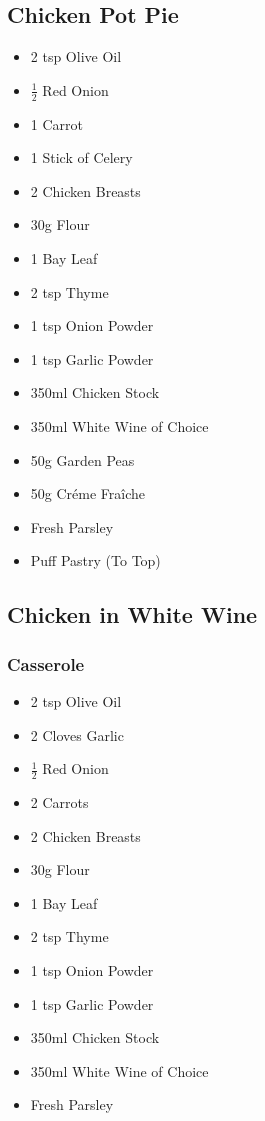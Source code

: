 \documentclass[11pt, english]{article}
\begin{document}
\newpage

	\subsection{Chicken Pot Pie}

	\begin{itemize}
	\setlength\itemsep{0cm}
		\item 2 tsp Olive Oil
		\item $\frac{1}{2}$ Red Onion
		\item 1 Carrot
		\item 1 Stick of Celery
		\item 2 Chicken Breasts
		\item 30g Flour
		\item 1 Bay Leaf
		\item 2 tsp Thyme
		\item 1 tsp Onion Powder
		\item 1 tsp Garlic Powder
		\item 350ml Chicken Stock
		\item 350ml White Wine of Choice
		\item 50g Garden Peas
		\item 50g Cr\'{e}me Fra\^{i}che
		\item Fresh Parsley
		\item Puff Pastry (To Top)
	\end{itemize}

\newpage

	\subsection{Chicken in White Wine}

		\subsubsection*{Casserole}

	\begin{itemize}
	\setlength\itemsep{0cm}
		\item 2 tsp Olive Oil
		\item 2 Cloves Garlic
		\item $\frac{1}{2}$ Red Onion
		\item 2 Carrots
		\item 2 Chicken Breasts
		\item 30g Flour
		\item 1 Bay Leaf
		\item 2 tsp Thyme
		\item 1 tsp Onion Powder
		\item 1 tsp Garlic Powder
		\item 350ml Chicken Stock
		\item 350ml White Wine of Choice
		\item Fresh Parsley
	\end{itemize}
\end{document}
